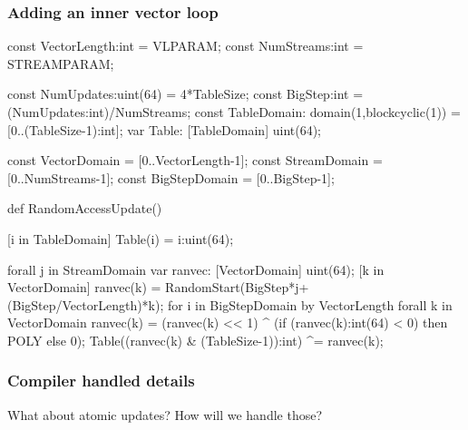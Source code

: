 \subsubsection{Adding an inner vector loop}

\begin{chapel}
const VectorLength:int = VLPARAM;
const NumStreams:int = STREAMPARAM;

const NumUpdates:uint(64) = 4*TableSize;
const BigStep:int = (NumUpdates:int)/NumStreams;
const TableDomain: domain(1,blockcyclic(1)) = [0..(TableSize-1):int];
var Table: [TableDomain] uint(64);

const VectorDomain = [0..VectorLength-1];
const StreamDomain = [0..NumStreams-1];
const BigStepDomain = [0..BigStep-1];

def RandomAccessUpdate() {

  [i in TableDomain] Table(i) = i:uint(64);

  forall j in StreamDomain {
    var ranvec: [VectorDomain] uint(64);
    [k in VectorDomain] ranvec(k) = RandomStart(BigStep*j+(BigStep/VectorLength)*k);
    for i in BigStepDomain by VectorLength{
      forall k in VectorDomain{
        ranvec(k) = (ranvec(k) << 1) ^ (if (ranvec(k):int(64) < 0) then POLY else 0);
        Table((ranvec(k) & (TableSize-1)):int) ^= ranvec(k);
      }
    }
  }
}
\end{chapel}

\subsubsection{Compiler handled details}
What about atomic updates?  How will we handle those?



